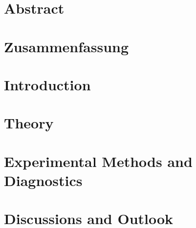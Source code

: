 \documentclass[headsepline, 12pt, openright, german, english]{scrbook}
\begin{document}
\thispagestyle{empty}


\clearpage
\thispagestyle{empty}

\cleardoublepage

\cleardoublepage
\setcounter{page}{3}
\chapter*{Abstract}

\cleardoublepage

\setcounter{page}{5}
\chapter*{Zusammenfassung}

\cleardoublepage

\tableofcontents

\mainmatter

\chapter{Introduction}
\label{chapter introduction}


 \chapter{Theory}
\label{chapter theory}


\chapter{Experimental Methods and Diagnostics}
\label{chapter Experimental Methods}


\chapter{Discussions and Outlook}



\newpage
\mbox{}
\thispagestyle{empty}
\newpage

\appendix
%
\end{document}
